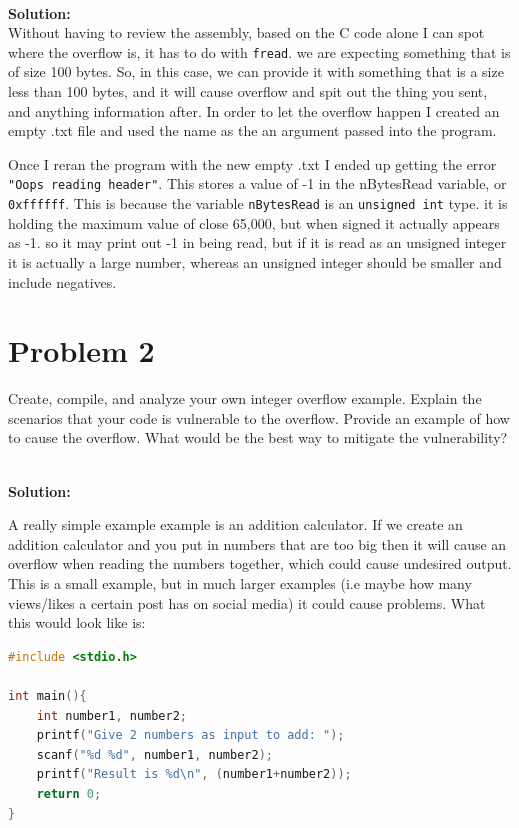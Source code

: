 \documentclass[12pt]{article}
\newcommand\tab[1][0.5cm]{\hspace*{#1}}
\begin{document}
\textbf{\\Solution:\\} 
\tab Without having to review the assembly, based on the C code alone I can spot where the overflow is, it has to do
with \texttt{fread}. we are expecting something that is of size 100 bytes. So, in this case, we can provide it with something 
that is a size less than 100 bytes, and it will cause overflow and spit out the thing you sent, and anything information 
after. In order to let the overflow happen I created an empty .txt file and used the name as the an argument passed into
the program. 

Once I reran the program with the new empty .txt I ended up getting the error \texttt{"Oops reading header"}. This stores a value of -1 in the nBytesRead variable, or \texttt{0xffffff}. This is because the variable \texttt{nBytesRead} is an \texttt{unsigned int} type. it is holding the maximum value of close 65,000, but when signed it actually appears as -1. so it may print out -1 in being read, but if it is read as an unsigned integer it is actually a large number, whereas an unsigned integer should be smaller and include negatives.




\section{Problem 2}
\tab Create, compile, and analyze your own integer overflow example. Explain the scenarios that
your code is vulnerable to the overflow. Provide an example of how to cause the overflow. What
would be the best way to mitigate the vulnerability?


\textbf{\\Solution:}

A really simple example example is an addition calculator. If we create an addition calculator and you put in numbers that are too big then it will cause an overflow when reading the numbers together, which could cause undesired output. This is a small example, but in much larger examples (i.e maybe how many views/likes a certain post has on social media) it could cause problems. What this would look like is:
\begin{lstlisting}[language=C]
#include <stdio.h>

int main(){
	int number1, number2;
	printf("Give 2 numbers as input to add: ");
	scanf("%d %d", number1, number2);
	printf("Result is %d\n", (number1+number2));
	return 0;
}
\end{lstlisting} 
\end{document}
